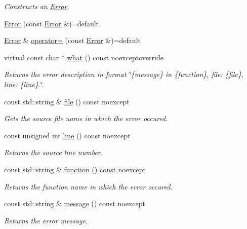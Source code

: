 \begin{DoxyCompactItemize}
\begin{DoxyCompactList}\small\item\em Constructs an \hyperlink{classdg_1_1deepcore_1_1_error}{Error}. \end{DoxyCompactList}\item 
\hyperlink{classdg_1_1deepcore_1_1_error_a52a11a112b48830eb9d49dc5e394b3d7}{Error} (const \hyperlink{classdg_1_1deepcore_1_1_error}{Error} \&)=default
\item 
\hyperlink{classdg_1_1deepcore_1_1_error}{Error} \& \hyperlink{classdg_1_1deepcore_1_1_error_a3a6f1fff16acc79358c1a6e45e43ad02}{operator=} (const \hyperlink{classdg_1_1deepcore_1_1_error}{Error} \&)=default
\item 
virtual const char $\ast$ \hyperlink{group___utility_module_ga7dff6b319144bcfcf602e0124fb0fb01}{what} () const noexceptoverride
\begin{DoxyCompactList}\small\item\em Returns the error description in format \char`\"{}\{message\} in \{function\}, file\+: \{file\}, line\+: \{line\}.\char`\"{}. \end{DoxyCompactList}\item 
const std\+::string \& \hyperlink{group___utility_module_ga0b75e32780cb8534179ff3c060739496}{file} () const noexcept
\begin{DoxyCompactList}\small\item\em Gets the source file name in which the error occured. \end{DoxyCompactList}\item 
const unsigned int \hyperlink{group___utility_module_ga13437b5caffe754b7a32fc3c514907e5}{line} () const noexcept
\begin{DoxyCompactList}\small\item\em Returns the source line number. \end{DoxyCompactList}\item 
const std\+::string \& \hyperlink{group___utility_module_gaa69c98222c56544a9094154a8eab4db9}{function} () const noexcept
\begin{DoxyCompactList}\small\item\em Returns the function name in which the error occured. \end{DoxyCompactList}\item 
const std\+::string \& \hyperlink{group___utility_module_ga7269ba8049ed86338733955565242539}{message} () const noexcept
\begin{DoxyCompactList}\small\item\em Returns the error message. \end{DoxyCompactList}\item 

\end{DoxyCompactItemize}
